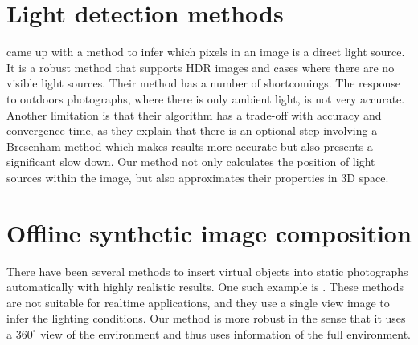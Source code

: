 \section{Light detection methods}
\citep{Laskowski2007} came up with a method to infer which pixels in an image is a direct light source. It is a robust method that supports HDR images and cases where there are no visible light sources. Their method has a number of shortcomings. The response to outdoors photographs, where there is only ambient light, is not very accurate. Another limitation is that their algorithm has a trade-off with accuracy and convergence time, as they explain that there is an optional step involving a Bresenham method which makes results more accurate but also presents a significant slow down. Our method not only calculates the position of light sources within the image, but also approximates their properties in 3D space. \newline
\section{Offline synthetic image composition} 
There have been several methods to insert virtual objects into static photographs automatically with highly realistic results. One such example is \citep{karsh2014}. These methods are not suitable for realtime applications, and they use a single view image to infer the lighting conditions. Our method is more robust in the sense that it uses a $360^{\circ}$ view of the environment and thus uses information of the full environment.\newline
